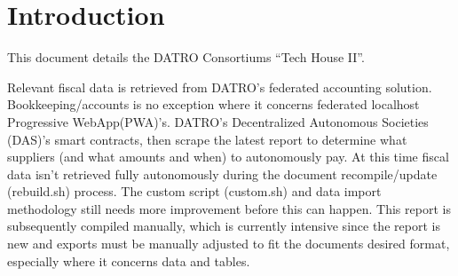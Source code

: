 \documentclass[letterpaper,10pt,openany,oneside,english]{sphinxmanual}
\begin{document}
\chapter{Introduction}
\label{\detokenize{introduction:introduction}}\label{\detokenize{introduction::doc}}
\sphinxAtStartPar
This document details the DATRO Consortiums “Tech House II”.

\sphinxAtStartPar
Relevant fiscal data is retrieved from DATRO’s federated accounting solution. Bookkeeping/accounts is no exception where it concerns federated localhost Progressive WebApp(PWA)’s.
DATRO’s Decentralized Autonomous Societies (DAS)’s smart contracts, then scrape the latest report to determine what suppliers (and what amounts and when) to autonomously pay.
At this time fiscal data isn’t retrieved fully autonomously during the document re\sphinxhyphen{}compile/update (rebuild.sh) process.
The custom script (custom.sh) and data import methodology still needs more improvement before this can happen.
This report is subsequently compiled manually, which is currently intensive since the report is new and exports must be manually adjusted to fit the documents desired format, especially where it concerns data and tables.
\end{document}
